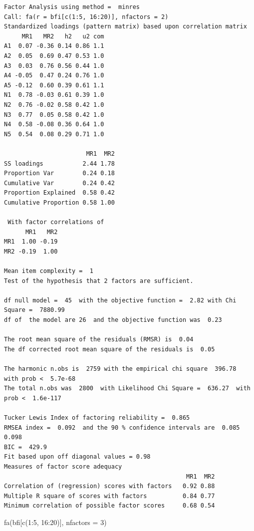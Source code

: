 \documentclass[
  letterpaper,
  DIV=11,
  numbers=noendperiod]{scrreprt}
\newenvironment{Shaded}{\begin{snugshade}}{\end{snugshade}}
\newcommand{\AttributeTok}[1]{\textcolor[rgb]{0.40,0.45,0.13}{#1}}
\newcommand{\DecValTok}[1]{\textcolor[rgb]{0.68,0.00,0.00}{#1}}
\newcommand{\FunctionTok}[1]{\textcolor[rgb]{0.28,0.35,0.67}{#1}}
\newcommand{\NormalTok}[1]{\textcolor[rgb]{0.00,0.23,0.31}{#1}}
\newcommand{\SpecialCharTok}[1]{\textcolor[rgb]{0.37,0.37,0.37}{#1}}
\begin{document}
\begin{verbatim}
Factor Analysis using method =  minres
Call: fa(r = bfi[c(1:5, 16:20)], nfactors = 2)
Standardized loadings (pattern matrix) based upon correlation matrix
     MR1   MR2   h2   u2 com
A1  0.07 -0.36 0.14 0.86 1.1
A2  0.05  0.69 0.47 0.53 1.0
A3  0.03  0.76 0.56 0.44 1.0
A4 -0.05  0.47 0.24 0.76 1.0
A5 -0.12  0.60 0.39 0.61 1.1
N1  0.78 -0.03 0.61 0.39 1.0
N2  0.76 -0.02 0.58 0.42 1.0
N3  0.77  0.05 0.58 0.42 1.0
N4  0.58 -0.08 0.36 0.64 1.0
N5  0.54  0.08 0.29 0.71 1.0

                       MR1  MR2
SS loadings           2.44 1.78
Proportion Var        0.24 0.18
Cumulative Var        0.24 0.42
Proportion Explained  0.58 0.42
Cumulative Proportion 0.58 1.00

 With factor correlations of 
      MR1   MR2
MR1  1.00 -0.19
MR2 -0.19  1.00

Mean item complexity =  1
Test of the hypothesis that 2 factors are sufficient.

df null model =  45  with the objective function =  2.82 with Chi Square =  7880.99
df of  the model are 26  and the objective function was  0.23 

The root mean square of the residuals (RMSR) is  0.04 
The df corrected root mean square of the residuals is  0.05 

The harmonic n.obs is  2759 with the empirical chi square  396.78  with prob <  5.7e-68 
The total n.obs was  2800  with Likelihood Chi Square =  636.27  with prob <  1.6e-117 

Tucker Lewis Index of factoring reliability =  0.865
RMSEA index =  0.092  and the 90 % confidence intervals are  0.085 0.098
BIC =  429.9
Fit based upon off diagonal values = 0.98
Measures of factor score adequacy             
                                                   MR1  MR2
Correlation of (regression) scores with factors   0.92 0.88
Multiple R square of scores with factors          0.84 0.77
Minimum correlation of possible factor scores     0.68 0.54
\end{verbatim}

\begin{Shaded}
\begin{Highlighting}[]
\FunctionTok{fa}\NormalTok{(bfi[}\FunctionTok{c}\NormalTok{(}\DecValTok{1}\SpecialCharTok{:}\DecValTok{5}\NormalTok{, }\DecValTok{16}\SpecialCharTok{:}\DecValTok{20}\NormalTok{)], }\AttributeTok{nfactors =} \DecValTok{3}\NormalTok{)}
\end{Highlighting}
\end{Shaded}
\end{document}

